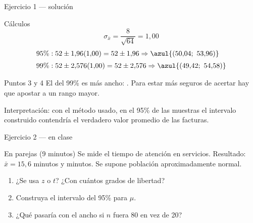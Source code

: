 \documentclass[aspectratio=169,10pt]{beamer}
\begin{document}
\begin{frame}{Ejercicio 1 — solución}
  \small
  \begin{block}{Cálculos}
    \[ \sigma_{\bar x}=\frac{8}{\sqrt{64}}=1{,}00 \]
    \begin{align*}
      95\%:\;& 52\pm 1{,}96(1{,}00)=52\pm 1{,}96
        \Rightarrow \azul{(50{,}04;\ 53{,}96)}\\[0.25em]
      99\%:\;& 52\pm 2{,}576(1{,}00)=52\pm 2{,}576
        \Rightarrow \azul{(49{,}42;\ 54{,}58)}
    \end{align*}
  \end{block}

  \vspace{-0.02cm}
  \begin{exampleblock}{Puntos 3 y 4}
    \scriptsize
    El del 99\% es más ancho: . Para
    estar más seguros de acertar hay que apostar a un rango mayor.

    \vspace{0.08cm}
    Interpretación: con el método usado, en el 95\% de las muestras el
    intervalo construido contendría el verdadero valor promedio de las
    facturas.
  \end{exampleblock}
\end{frame}

\begin{frame}{Ejercicio 2 — en clase}
  \begin{alertblock}{En parejas (9 minutos)}
    Se mide el tiempo de atención en  servicios. Resultado:
    $\bar{x}=15{,}6$ minutos y  minutos. Se supone
    población aproximadamente normal.

    \vspace{0.25cm}
    \begin{enumerate}
      \item ¿Se usa $z$ o $t$? ¿Con cuántos grados de libertad?
      \item Construya el intervalo del 95\% para $\mu$.
      \item ¿Qué pasaría con el ancho si $n$ fuera 80 en vez de 20?
    \end{enumerate}
  \end{alertblock}
\end{frame}
\end{document}
